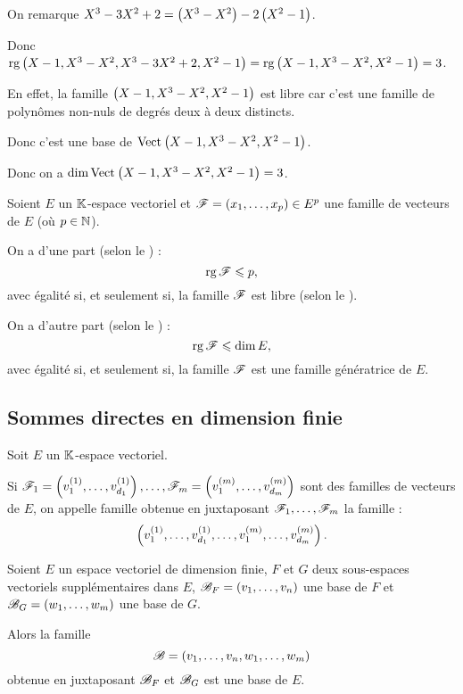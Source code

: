 \begin{corr}[2]
On remarque \(X^3-3X^2+2=\left(X^3-X^2\right)-2\left(X^2-1\right)\).

Donc \(\operatorname{rg}\left(X-1,X^3-X^2,X^3-3X^2+2,X^2-1\right)=\operatorname{rg}\left(X-1,X^3-X^2,X^2-1\right)=3\).

En effet, la famille \(\left(X-1,X^3-X^2,X^2-1\right)\) est libre car c'est une famille de polynômes non-nuls de degrés deux à deux distincts.

Donc c'est une base de \(\Vect{X-1,X^3-X^2,X^2-1}\).

Donc on a \(\dim\Vect{X-1,X^3-X^2,X^2-1}=3\).
\end{corr}

\begin{rem}
Soient \(E\) un \(\mathbb{K}\)-espace vectoriel et \(\mathscr{F}=\left(x_1,\dots,x_p\right)\in E^p\) une famille de vecteurs de \(E\) (où \(p\in\mathbb{N}\)).

On a d'une part (selon le ) : \[\operatorname{rg}\mathscr{F}\leqslant p,\] avec égalité si, et seulement si, la famille \(\mathscr{F}\) est libre (selon le ).

On a d'autre part (selon le ) : \[\operatorname{rg}\mathscr{F}\leqslant\dim E,\] avec égalité si, et seulement si, la famille \(\mathscr{F}\) est une famille génératrice de \(E\).
\end{rem}

\subsection{Sommes directes en dimension finie}

\begin{defi}
Soit \(E\) un \(\mathbb{K}\)-espace vectoriel.

Si \(\mathscr{F}_1=\left(v_1^{\left(1\right)},\dots,v_{d_1}^{\left(1\right)}\right),\dots,\mathscr{F}_m=\left(v_1^{\left(m\right)},\dots,v_{d_m}^{\left(m\right)}\right)\) sont des familles de vecteurs de \(E\), on appelle famille obtenue en juxtaposant \(\mathscr{F}_1,\dots,\mathscr{F}_m\) la famille : \[\left(v_1^{\left(1\right)},\dots,v_{d_1}^{\left(1\right)},\dots,v_1^{\left(m\right)},\dots,v_{d_m}^{\left(m\right)}\right).\]
\end{defi}

\begin{prop}
Soient \(E\) un espace vectoriel de dimension finie, \(F\) et \(G\) deux sous-espaces vectoriels supplémentaires dans \(E\), \(\mathscr{B}_F=\left(v_1,\dots,v_n\right)\) une base de \(F\) et \(\mathscr{B}_G=\left(w_1,\dots,w_m\right)\) une base de \(G\).

Alors la famille \[\mathscr{B}=\left(v_1,\dots,v_n,w_1,\dots,w_m\right)\] obtenue en juxtaposant \(\mathscr{B}_F\) et \(\mathscr{B}_G\) est une base de \(E\).
\end{prop}

